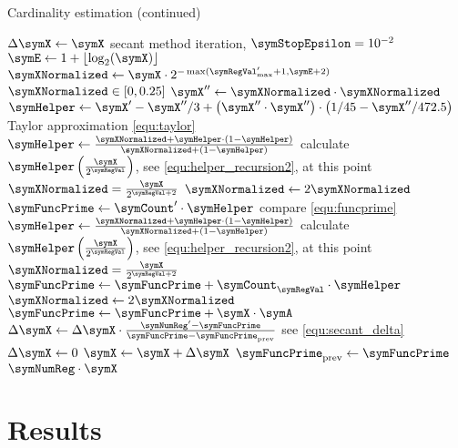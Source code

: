 \documentclass[11pt]{article} %
\begin{document}
\begin{algorithm}
\caption{Cardinality estimation (continued)}
\begin{algorithmic}
\State $\Delta\symX \gets \symX$
\While{$\Delta\symX > \symX\cdot\symError$} \Comment secant method iteration, $\symStopEpsilon = 10^{-2}$
\State $\symE \gets 1+\lfloor\log_2(\symX)\rfloor$
\State $\symXNormalized \gets
\symX \cdot 2^{-\max(\symRegVal'_\text{max}+1, \symE+2)}$
\Comment $\symXNormalized \in [0, 0.25]$
\State $\symX''\gets \symXNormalized\cdot\symXNormalized$
\State $\symHelper \gets
\symX' - \symX''/3 + \left(\symX''\cdot \symX''\right)\cdot\left(1/45-\symX''/472.5\right)$
\Comment Taylor approximation \eqref{equ:taylor}
\State $\symHelper \gets \frac{\symXNormalized+\symHelper\cdot(1-\symHelper)}{\symXNormalized+(1-\symHelper)}$
\Comment calculate $\symHelper\left(\frac{\symX}{2^{\symRegVal}}\right)$, see \eqref{equ:helper_recursion2}, at this point $\symXNormalized = \frac{\symX}{2^{\symRegVal+2}}$
\State $\symXNormalized \gets 2\symXNormalized$
\EndFor
\State $\symFuncPrime \gets \symCount'\cdot\symHelper$
\Comment compare \eqref{equ:funcprime}
\State $\symHelper \gets \frac{\symXNormalized+\symHelper\cdot(1-\symHelper)}{\symXNormalized+(1-\symHelper)}$
\Comment calculate $\symHelper\left(\frac{\symX}{2^{\symRegVal}}\right)$, see \eqref{equ:helper_recursion2}, at this point $\symXNormalized = \frac{\symX}{2^{\symRegVal+2}}$
\State $\symFuncPrime\gets \symFuncPrime + \symCount_\symRegVal\cdot\symHelper$
\State $\symXNormalized \gets 2\symXNormalized$
\EndFor
\State $\symFuncPrime\gets \symFuncPrime + \symX\cdot\symA$
\State $\Delta\symX \gets \Delta\symX \cdot \frac{\symNumReg' - \symFuncPrime}{\symFuncPrime - \symFuncPrime_\text{prev}}$
\Comment see \eqref{equ:secant_delta}
\Else
\State $\Delta\symX \gets 0$
\EndIf
\State $\symX \gets \symX + \Delta\symX$
\State $\symFuncPrime_\text{prev}\gets \symFuncPrime$
\EndWhile
\State \Return $\symNumReg\cdot\symX$
\EndFunction
\end{algorithmic}
\end{algorithm}



\section{Results}
\end{document}
